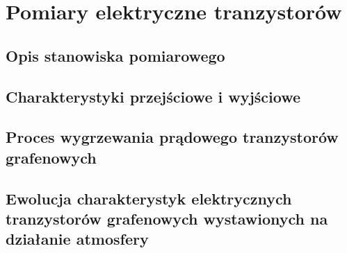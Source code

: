 \chapter{Pomiary elektryczne tranzystorów}
	\section{Opis stanowiska pomiarowego}
	\section{Charakterystyki przejściowe i wyjściowe}
	\section{Proces wygrzewania prądowego tranzystorów grafenowych}
	\section{Ewolucja charakterystyk elektrycznych tranzystorów grafenowych wystawionych na działanie atmosfery}

